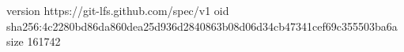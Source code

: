 version https://git-lfs.github.com/spec/v1
oid sha256:4c2280bd86da860dea25d936d2840863b08d06d34cb47341cef69c355503ba6a
size 161742

